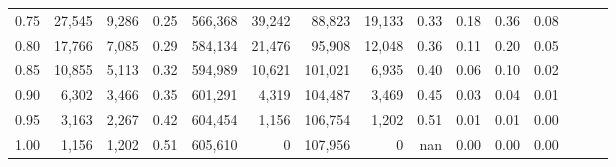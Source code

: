 \begin{tabular}{rrrrrrrrrrrrrrr}
0.75 &  27,545 &   9,286 &  0.25 &  566,368 &   39,242 &   88,823 &   19,133 &  0.33 &  0.18 &  0.36 &      0.08 \\
0.80 &  17,766 &   7,085 &  0.29 &  584,134 &   21,476 &   95,908 &   12,048 &  0.36 &  0.11 &  0.20 &      0.05 \\
0.85 &  10,855 &   5,113 &  0.32 &  594,989 &   10,621 &  101,021 &    6,935 &  0.40 &  0.06 &  0.10 &      0.02 \\
0.90 &   6,302 &   3,466 &  0.35 &  601,291 &    4,319 &  104,487 &    3,469 &  0.45 &  0.03 &  0.04 &      0.01 \\
0.95 &   3,163 &   2,267 &  0.42 &  604,454 &    1,156 &  106,754 &    1,202 &  0.51 &  0.01 &  0.01 &      0.00 \\
1.00 &   1,156 &   1,202 &  0.51 &  605,610 &        0 &  107,956 &        0 &   nan &  0.00 &  0.00 &      0.00 \\
\bottomrule
\end{tabular}
